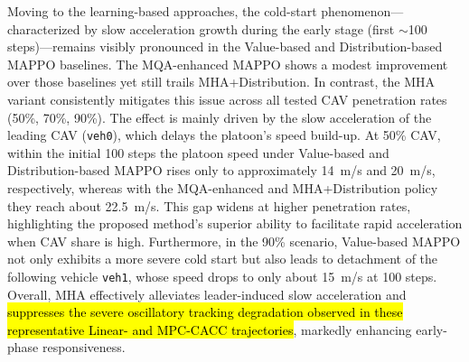 \documentclass{ieeeaccess}
\begin{document}
Moving to the learning-based approaches, the cold-start phenomenon—characterized by slow acceleration growth during the early stage (first $\sim$100 steps)—remains visibly pronounced in the Value-based and Distribution-based MAPPO baselines. The MQA-enhanced MAPPO shows a modest improvement over those baselines yet still trails MHA+Distribution. In contrast, the MHA variant consistently mitigates this issue across all tested CAV penetration rates (50\%, 70\%, 90\%). The effect is mainly driven by the slow acceleration of the leading CAV (\texttt{veh0}), which delays the platoon’s speed build-up. At 50\% CAV, within the initial 100 steps the platoon speed under Value-based and Distribution-based MAPPO rises only to approximately 14~m/s and 20~m/s, respectively, whereas with the MQA-enhanced and MHA+Distribution policy they reach about 22.5~m/s. This gap widens at higher penetration rates, highlighting the proposed method’s superior ability to facilitate rapid acceleration when CAV share is high. Furthermore, in the 90\% scenario, Value-based MAPPO not only exhibits a more severe cold start but also leads to detachment of the following vehicle \texttt{veh1}, whose speed drops to only about 15~m/s at 100 steps. Overall, MHA effectively alleviates leader-induced slow acceleration and \hl{suppresses the severe oscillatory tracking degradation observed in these representative Linear- and MPC-CACC trajectories}, markedly enhancing early-phase responsiveness.
\end{document}
